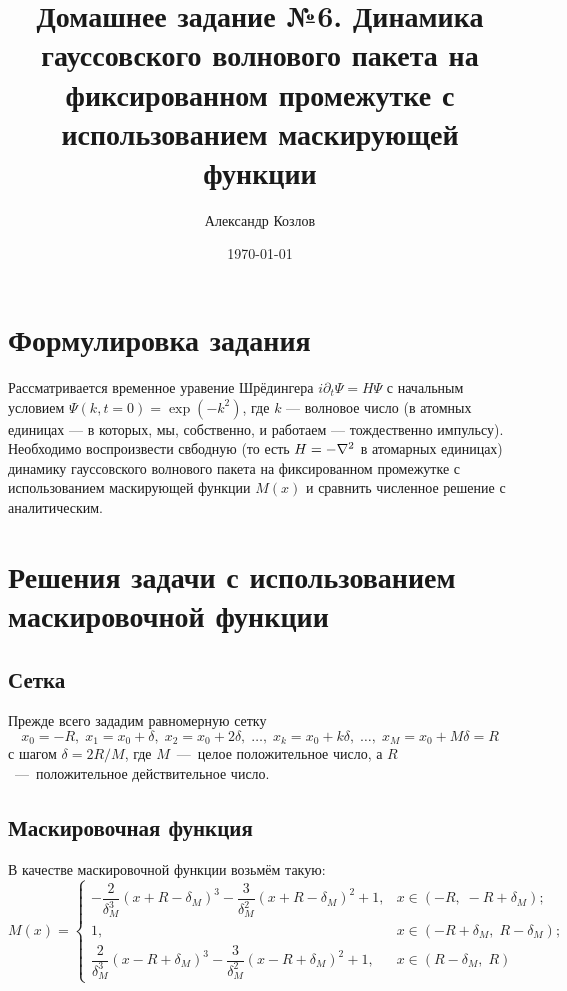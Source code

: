 \documentclass[10pt]{article}
\title{Домашнее задание №6. Динамика гауссовского волнового пакета на фиксированном промежутке с использованием маскирующей функции}
\author{Александр Козлов}
\date{\today}
\begin{document}
\maketitle

\section*{Формулировка задания}

Рассматривается временное уравение Шрёдингера $i \partial_t \Psi = H \Psi$ с начальным условием $\Psi(k,t=0) = \exp(-k^2)$, где $k$ --- волновое число (в атомных единицах --- в которых, мы, собственно, и работаем --- тождественно импульсу). Необходимо воспроизвести свбодную (то есть $H=-\laplacian$ в атомарных единицах) динамику гауссовского волнового пакета на фиксированном промежутке с использованием маскирующей функции $M(x)$ и сравнить численное решение с аналитическим.

\section{Решения задачи с использованием маскировочной функции}

\subsection*{Сетка}
Прежде всего зададим равномерную сетку
\begin{equation}
	x_0 = -R,\; x_1 = x_0 + \delta,\; x_2 = x_0 + 2\delta,\; \ldots,\; x_k = x_0 + k\delta,\; \ldots,\; x_M = x_0 + M \delta = R
\end{equation}
с шагом $\delta = 2R/M$, где $M$~---~целое положительное число, а $R$~---~положительное действительное число.

\subsection*{Маскировочная функция}
В качестве маскировочной функции возьмём такую:
\begin{equation}
	M(x) = 
	\begin{cases}
		-\dfrac{2}{\delta_M^3}(x+R-\delta_M)^3 - \dfrac{3}{\delta_M^2} (x+R-\delta_M)^2 + 1, &x\in(-R,\; -R+\delta_M);\\
		1, &x\in(-R+\delta_M,\; R-\delta_M);\\
		\dfrac{2}{\delta_M^3}(x-R+\delta_M)^3 - \dfrac{3}{\delta_M^2} (x-R+\delta_M)^2 + 1, &x\in(R-\delta_M,\; R)
	\end{cases}
\end{equation}
\end{document}
